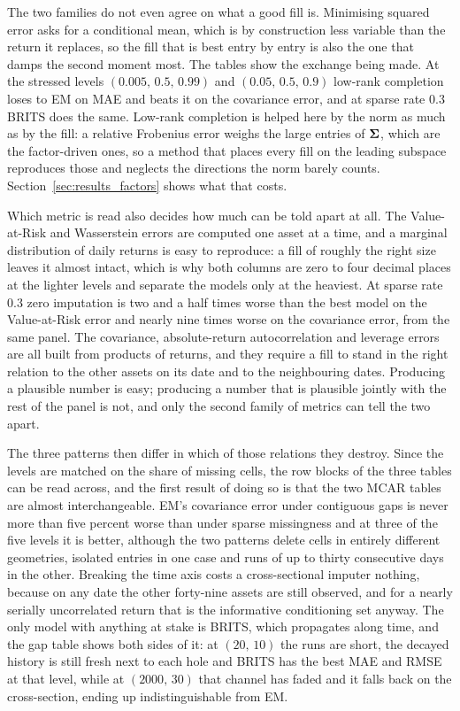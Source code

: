The two families do not even agree on what a good fill is. Minimising squared
error asks for a conditional mean, which is by construction less variable than
the return it replaces, so the fill that is best entry by entry is also the one
that damps the second moment most. The tables show the exchange being made. At
the stressed levels $(0.005,\, 0.5,\, 0.99)$ and $(0.05,\, 0.5,\, 0.9)$
low-rank completion loses to EM on MAE and beats it on the covariance error,
and at sparse rate $0.3$ BRITS does the same. Low-rank completion is helped
here by the norm as much as by the fill: a relative Frobenius error weighs the
large entries of $\boldsymbol{\Sigma}$, which are the factor-driven ones, so a method that
places every fill on the leading subspace reproduces those and neglects the
directions the norm barely counts. Section~\ref{sec:results_factors} shows what
that costs.

Which metric is read also decides how much can be told apart at all. The
Value-at-Risk and Wasserstein errors are computed one asset at a time, and a
marginal distribution of daily returns is easy to reproduce: a fill of roughly
the right size leaves it almost intact, which is why both columns are zero to
four decimal places at the lighter levels and separate the models only at the
heaviest. At sparse rate $0.3$ zero imputation is two and a half times worse
than the best model on the Value-at-Risk error and nearly nine times worse on
the covariance error, from the same panel. The covariance, absolute-return
autocorrelation and leverage errors are all built from products of returns,
and they require a fill to stand in the right relation to the other assets on
its date and to the neighbouring dates. Producing a plausible number is easy;
producing a number that is plausible jointly with the rest of the panel is
not, and only the second family of metrics can tell the two apart.

The three patterns then differ in which of those relations they destroy. Since
the levels are matched on the share of missing cells, the row blocks of the
three tables can be read across, and the first result of doing so is that the
two MCAR tables are almost interchangeable. EM's covariance error under
contiguous gaps is never more than five percent worse than under sparse
missingness and at three of the five levels it is better, although the two
patterns delete cells in entirely different geometries, isolated entries in one
case and runs of up to thirty consecutive days in the other. Breaking the time
axis costs a cross-sectional imputer nothing, because on any date the other
forty-nine assets are still observed, and for a nearly serially uncorrelated
return that is the informative conditioning set anyway. The only model with
anything at stake is BRITS, which propagates along time, and the gap table
shows both sides of it: at $(20,\, 10)$ the runs are short, the decayed history
is still fresh next to each hole and BRITS has the best MAE and RMSE at that
level, while at $(2000,\, 30)$ that channel has faded and it falls back on the
cross-section, ending up indistinguishable from EM.

